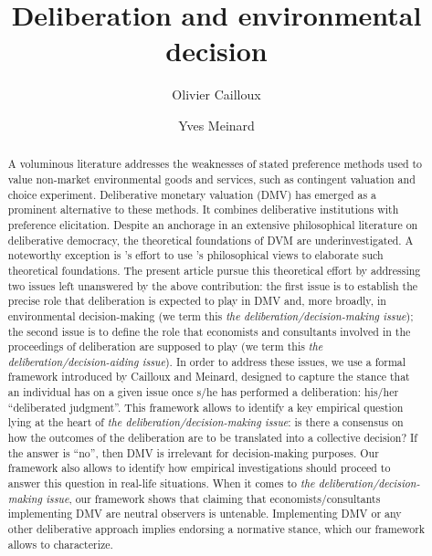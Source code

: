\documentclass[smallextended,nospthms,natbib]{svjour3}
\begin{document}
\title{Deliberation and environmental decision}
\author{Olivier Cailloux \and Yves Meinard}
\makeatletter
\makeatother
\maketitle


\begin{abstract}
A voluminous literature addresses the weaknesses of stated preference methods used to value non-market environmental goods and services, such as contingent valuation and choice experiment. Deliberative monetary valuation (DMV) has emerged as a prominent alternative to these methods. It combines deliberative institutions with preference elicitation. Despite an anchorage in an extensive philosophical literature on deliberative democracy, the theoretical foundations of DVM are underinvestigated.  A noteworthy exception is \citet{bartkowski_beyond_2018}'s effort to use \citet{sen_idea_2009}'s philosophical views to elaborate such theoretical foundations. The present article pursue this theoretical effort by addressing two issues left unanswered by the above contribution: the first issue is to establish the precise role that deliberation is expected to play in DMV and, more broadly, in environmental decision-making (we term this \emph{the deliberation/decision-making issue}); the second issue is to define the role that economists and consultants involved in the proceedings of deliberation are supposed to play (we term this \emph{the deliberation/decision-aiding issue}). In order to address these issues, we use a formal framework introduced by Cailloux and Meinard, designed to capture the stance that an individual has on a given issue once s/he has performed a deliberation: his/her ``deliberated judgment''. This framework allows to identify a key empirical question lying at the heart of \emph{the deliberation/decision-making issue}: is there a consensus on how the outcomes of the deliberation are to be translated into a collective decision? If the answer is ``no'', then DMV is irrelevant for decision-making purposes. Our framework also allows to identify how empirical investigations should proceed to answer this question in real-life situations. When it comes to \emph{the deliberation/decision-making issue}, our framework shows that claiming that economists/consultants implementing DMV are neutral observers is untenable. Implementing DMV or any other deliberative approach implies endorsing a normative stance, which our framework allows to characterize.
\end{abstract}
\end{document}
